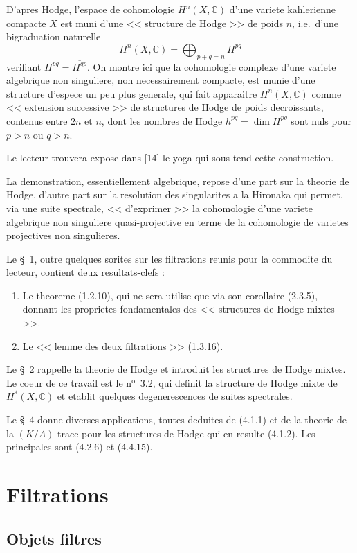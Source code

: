 \documentclass[11pt,a4paper]{amsart}
\theoremstyle{plain}
\theoremstyle{definition}
\theoremstyle{remark}
\newcommand{\bC}{\mathbb{C}}
\numberwithin{equation}{subsection}
\begin{document}
D'apres Hodge, l'espace de cohomologie $H^n(X, \bC)$ d'une variete kahlerienne
compacte $X$ est muni d'une << structure de Hodge >> de poids $n$, i.e.\ d'une bigraduation
naturelle
\[
H^n(X, \bC) = \bigoplus_{p+q=n} H^{pq}
\]
verifiant $H^{pq} = \overline{H^{qp}}$. On montre ici que la cohomologie complexe d'une variete
algebrique non singuliere, non necessairement compacte, est munie d'une structure
d'espece un peu plus generale, qui fait apparaitre $H^n(X, \bC)$ comme << extension
successive >> de structures de Hodge de poids decroissants, contenus entre $2n$ et $n$, dont
les nombres de Hodge $h^{pq} = \dim H^{pq}$ sont nuls pour $p>n$ ou $q>n$.

Le lecteur trouvera expose dans [14] le yoga qui sous-tend cette construction.

La demonstration, essentiellement algebrique, repose d'une part sur la theorie
de Hodge, d'autre part sur la resolution des singularites a la Hironaka qui permet,
via une suite spectrale, << d'exprimer >> la cohomologie d'une variete algebrique non
singuliere quasi-projective en terme de la cohomologie de varietes projectives non
singulieres.

Le \S\ 1, outre quelques sorites sur les filtrations reunis pour la commodite du lecteur,
contient deux resultats-clefs :
\begin{enumerate}
\item[a)] Le theoreme (1.2.10), qui ne sera utilise que via son corollaire (2.3.5),
donnant les proprietes fondamentales des << structures de Hodge mixtes >>.
\item[b)] Le << lemme des deux filtrations >> (1.3.16).
\end{enumerate}

Le \S\ 2 rappelle la theorie de Hodge et introduit les structures de Hodge mixtes.
Le coeur de ce travail est le n$^{\mathrm{o}}$~3.2, qui definit la structure de Hodge mixte de
$H^*(X, \bC)$ et etablit quelques degenerescences de suites spectrales.

Le \S\ 4 donne diverses applications, toutes deduites de (4.1.1) et de la theorie
de la $(K/A)$-trace pour les structures de Hodge qui en resulte (4.1.2). Les principales
sont (4.2.6) et (4.4.15).

\section{Filtrations}

\subsection{Objets filtres}
\end{document}
